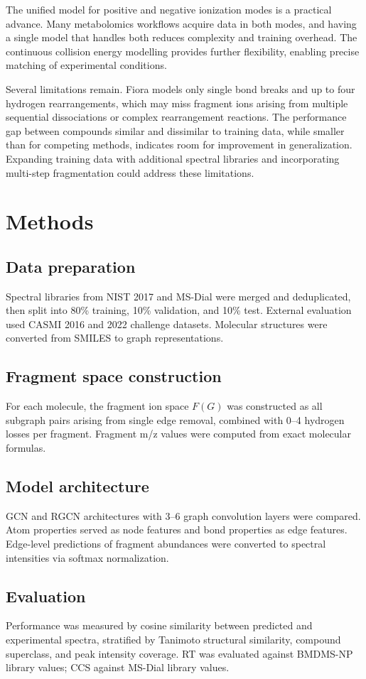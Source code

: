 \documentclass[11pt]{article}
\begin{document}
The unified model for positive and negative ionization modes is a practical advance. Many metabolomics workflows acquire data in both modes, and having a single model that handles both reduces complexity and training overhead. The continuous collision energy modelling provides further flexibility, enabling precise matching of experimental conditions.

Several limitations remain. Fiora models only single bond breaks and up to four hydrogen rearrangements, which may miss fragment ions arising from multiple sequential dissociations or complex rearrangement reactions. The performance gap between compounds similar and dissimilar to training data, while smaller than for competing methods, indicates room for improvement in generalization. Expanding training data with additional spectral libraries and incorporating multi-step fragmentation could address these limitations.

\section{Methods}

\subsection{Data preparation}
Spectral libraries from NIST 2017 and MS-Dial were merged and deduplicated, then split into 80\% training, 10\% validation, and 10\% test. External evaluation used CASMI 2016 and 2022 challenge datasets. Molecular structures were converted from SMILES to graph representations.

\subsection{Fragment space construction}
For each molecule, the fragment ion space $F(G)$ was constructed as all subgraph pairs arising from single edge removal, combined with 0--4 hydrogen losses per fragment. Fragment m/z values were computed from exact molecular formulas.

\subsection{Model architecture}
GCN and RGCN architectures with 3--6 graph convolution layers were compared. Atom properties served as node features and bond properties as edge features. Edge-level predictions of fragment abundances were converted to spectral intensities via softmax normalization.

\subsection{Evaluation}
Performance was measured by cosine similarity between predicted and experimental spectra, stratified by Tanimoto structural similarity, compound superclass, and peak intensity coverage. RT was evaluated against BMDMS-NP library values; CCS against MS-Dial library values.


\end{document}
